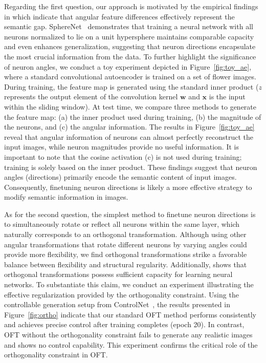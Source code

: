 Regarding the first question, our approach is motivated by the empirical findings in \cite{liu2018decoupled,chen2020angular} which indicate that angular feature differences effectively represent the semantic gap. SphereNet~\cite{liu2017deep} demonstrates that training a neural network with all neurons normalized to lie on a unit hypersphere maintains comparable capacity and even enhances generalization, suggesting that neuron directions encapsulate the most crucial information from the data. To further highlight the significance of neuron angles, we conduct a toy experiment depicted in Figure~\ref{fig:toy_ae}, where a standard convolutional autoencoder is trained on a set of flower images. During training, the feature map is generated using the standard inner product ($z$ represents the output element of the convolution kernel $\bm{w}$ and $\bm{x}$ is the input within the sliding window). At test time, we compare three methods to generate the feature map: (a) the inner product used during training, (b) the magnitude of the neurons, and (c) the angular information. The results in Figure~\ref{fig:toy_ae} reveal that angular information of neurons can almost perfectly reconstruct the input images, while neuron magnitudes provide no useful information. It is important to note that the cosine activation (c) is not used during training; training is solely based on the inner product. These findings suggest that neuron angles (directions) primarily encode the semantic content of input images. Consequently, finetuning neuron directions is likely a more effective strategy to modify semantic information in images.

As for the second question, the simplest method to finetune neuron directions is to simultaneously rotate or reflect all neurons within the same layer, which naturally corresponds to an orthogonal transformation. Although using other angular transformations that rotate different neurons by varying angles could provide more flexibility, we find orthogonal transformations strike a favorable balance between flexibility and structural regularity. Additionally, \cite{liu2021orthogonal} shows that orthogonal transformations possess sufficient capacity for learning neural networks. To substantiate this claim, we conduct an experiment illustrating the effective regularization provided by the orthogonality constraint. Using the controllable generation setup from ControlNet~\cite{zhang2023adding}, the results presented in Figure~\ref{fig:ortho} indicate that our standard OFT method performs consistently and achieves precise control after training completes (epoch 20). In contrast, OFT without the orthogonality constraint fails to generate any realistic images and shows no control capability. This experiment confirms the critical role of the orthogonality constraint in OFT.

